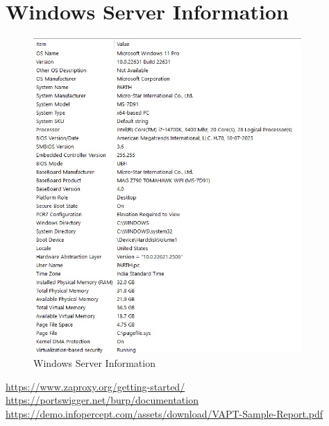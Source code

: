 \documentclass[openany]{report}
\begin{document}
\section{Windows Server Information}
\begin{figure}[H]
    \centering
    \includegraphics[width=0.91\textwidth]{imgs/Windowsinfo.jpg}
    \caption{ Windows Server Information}
    \label{fig:my_label14}
\end{figure}



\clearpage
\begin{thebibliography}{10}
     \url{https://www.zaproxy.org/getting-started/}
     \url{https://portswigger.net/burp/documentation}
     \url{https://demo.infopercept.com/assets/download/VAPT-Sample-Report.pdf}
\end{thebibliography}
\end{document}
